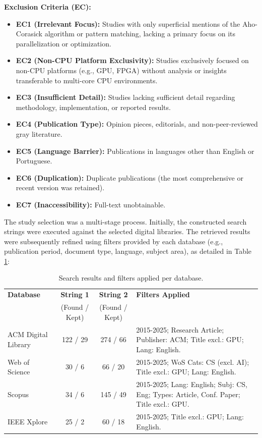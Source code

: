 \textbf{Exclusion Criteria (EC):}
\begin{itemize}
    \item \textbf{EC1 (Irrelevant Focus):} Studies with only superficial mentions of the Aho-Corasick algorithm or pattern matching, lacking a primary focus on its parallelization or optimization.
    \item \textbf{EC2 (Non-CPU Platform Exclusivity):} Studies exclusively focused on non-CPU platforms (e.g., GPU, FPGA) without analysis or insights transferable to multi-core CPU environments.
    \item \textbf{EC3 (Insufficient Detail):} Studies lacking sufficient detail regarding methodology, implementation, or reported results.
    \item \textbf{EC4 (Publication Type):} Opinion pieces, editorials, and non-peer-reviewed gray literature.
    \item \textbf{EC5 (Language Barrier):} Publications in languages other than English or Portuguese.
    \item \textbf{EC6 (Duplication):} Duplicate publications (the most comprehensive or recent version was retained).
    \item \textbf{EC7 (Inaccessibility):} Full-text unobtainable.
\end{itemize}


The study selection was a multi-stage process. Initially, the constructed search strings were executed against the selected digital libraries. The retrieved results were subsequently refined using filters provided by each database (e.g., publication period, document type, language, subject area), as detailed in Table \ref{tab:search_results}:

\begin{table}[H]
    \centering
    \caption{Search results and filters applied per database.}
    \label{tab:search_results}
    \small
    \begin{tabular}{@{} l c c p{7.5cm} @{}}
        \toprule
        \textbf{Database} & \textbf{String 1} & \textbf{String 2} & \textbf{Filters Applied} \\
        & \multicolumn{1}{c}{\scriptsize{(Found / Kept)}} & \multicolumn{1}{c}{\scriptsize{(Found / Kept)}} & \\
        \midrule
        ACM Digital Library & 122 / 29 & 274 / 66 & 2015-2025; Research Article; Publisher: ACM; Title excl.: GPU; Lang: English. \\ \addlinespace
        Web of Science & 30 / 6 & 66 / 20 & 2015-2025; WoS Cats: CS (excl. AI); Title excl.: GPU; Lang: English. \\ \addlinespace
        Scopus & 34 / 6 & 145 / 49 & 2015-2025; Lang: English; Subj: CS, Eng; Types: Article, Conf. Paper; Title excl.: GPU. \\ \addlinespace
        IEEE Xplore & 25 / 2 & 60 / 18 & 2015-2025; Title excl.: GPU; Lang: English. \\
        \bottomrule
    \end{tabular}
\end{table}

